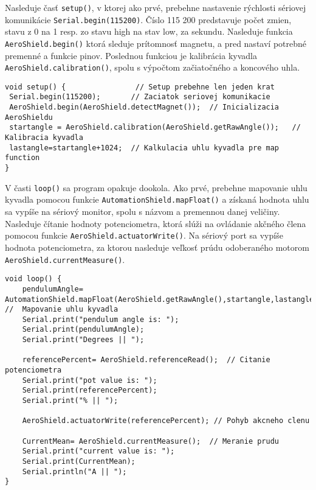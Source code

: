 Nasleduje časť \verb|setup()|, v ktorej ako prvé, prebehne nastavenie rýchlosti sériovej komunikácie \verb|Serial.begin(115200)|. Číslo 115 200 predstavuje počet zmien, stavu z 0 na 1 resp. zo stavu high na stav low, za sekundu. Nasleduje funkcia \verb|AeroShield.begin()| ktorá sleduje prítomnosť magnetu, a pred nastaví potrebné premenné a funkcie pinov. Poslednou funkciou je kalibrácia kyvadla \verb|AeroShield.calibration()|, spolu s výpočtom začiatočného a koncového uhla. 

\begin{lstlisting}[caption={AeroShield open loop setup().},captionpos=b]
void setup() {                // Setup prebehne len jeden krat 
 Serial.begin(115200);       // Zaciatok seriovej komunikacie 
 AeroShield.begin(AeroShield.detectMagnet());  // Inicializacia AeroShieldu 
 startangle = AeroShield.calibration(AeroShield.getRawAngle());   // Kalibracia kyvadla
 lastangle=startangle+1024;  // Kalkulacia uhlu kyvadla pre map function
}
\end{lstlisting}

V časti \verb|loop()| sa program opakuje dookola. Ako prvé, prebehne mapovanie uhlu kyvadla pomocou funkcie \verb|AutomationShield.mapFloat()| a získaná hodnota uhlu sa vypíše na sériový monitor, spolu s názvom a premennou danej veličiny. Nasleduje čítanie hodnoty potenciometra, ktorá slúži na ovládanie akčného člena pomocou funkcie \verb|AeroShield.actuatorWrite()|. Na sériový port sa vypíše hodnota potenciometra, za ktorou nasleduje veľkosť prúdu odoberaného motorom \verb| AeroShield.currentMeasure()|. 

\begin{lstlisting}[caption={AeroShield open loop loop().},captionpos=b]
void loop() {
	pendulumAngle= AutomationShield.mapFloat(AeroShield.getRawAngle(),startangle,lastangle,0.00,90.00);    //  Mapovanie uhlu kyvadla 
	Serial.print("pendulum angle is: ");
	Serial.print(pendulumAngle);    
	Serial.print("Degrees || ");
	
	referencePercent= AeroShield.referenceRead();  // Citanie potenciometra
	Serial.print("pot value is: ");
	Serial.print(referencePercent);  
	Serial.print("% || ");
	
	AeroShield.actuatorWrite(referencePercent); // Pohyb akcneho clenu
	
	CurrentMean= AeroShield.currentMeasure();  // Meranie prudu
	Serial.print("current value is: ");
	Serial.print(CurrentMean);   
	Serial.println("A || ");
}
\end{lstlisting}

